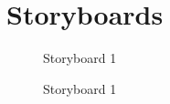 \documentclass[5pt]{article} %
\begin{document}
\newpage
\section{Storyboards}
\begin{figure}[h]
\caption{Storyboard 1}
\end{figure}
\begin{figure}[h]
\caption{Storyboard 1}
\end{figure}
\end{document}
